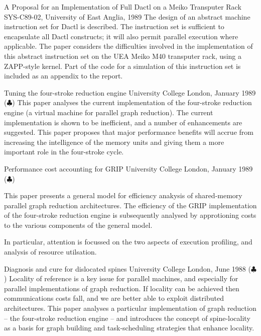 {A Proposal for an Implementation of Full Dactl on a Meiko Transputer Rack}
{SYS-C89-02, University of East Anglia, 1989}
{
The  design  of  an  abstract  machine  instruction  set  for  Dactl  is
described.   The  instruction set is sufficient to encapsulate all Dactl
constructs; it will also permit  parallel  execution  where  applicable.
The  paper  considers the difficulties involved in the implementation of
this abstract instruction set on the  UEA  Meiko  M40  transputer  rack,
using  a  ZAPP-style  kernel.  Part of the code for a simulation of this
instruction set is included as an appendix to the report.
}

{Tuning the four-stroke reduction engine}
{University College London, January 1989 ($\clubsuit$)}
{
This paper analyses the current implementation of the four-stroke reduction
engine (a virtual machine for parallel graph reduction).
The current implementation is shown to be inefficient, and a number of 
enhancements are suggested.
This paper proposes that major performance benefits will accrue from
increasing the intelligence of the memory units and giving them a more 
important role in the four-stroke cycle.
}

{Performance cost accounting for GRIP}
{University College London, January 1989 ($\clubsuit$)}
{
This paper presents a general model for efficiency anakysis of shared-memory
parallel graph reduction architectures.
The efficiency of the GRIP implementation of the four-stroke reduction engine
is subsequently analysed by approtioning costs to the various components
of the general model.

In particular, attention is focussed on the two aspects of execution 
profiling, and analysis of resource utilsation.
}

{Diagnosis and cure for dislocated spines}
{University College London, June 1988 ($\clubsuit$)}
{
Locality of reference is a key issue for parallel machines, and especially
for parallel implementations of graph reduction.
If locality can be achieved then communications costs fall,
and we are better able to exploit distributed architectures.
This paper analyses a particular implementation of graph reduction -- 
the four-stroke reduction engine -- and introduces the concept of 
spine-locality as a basis for graph building and task-scheduling strategies
that enhance locality.
}


